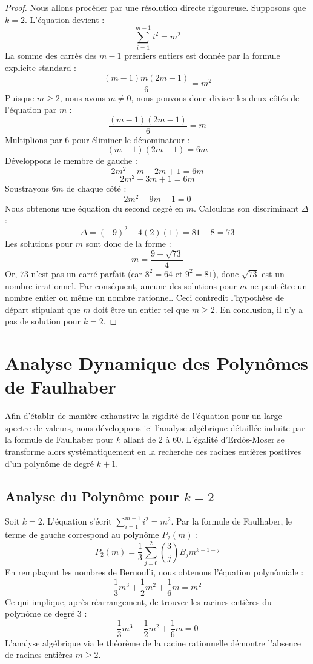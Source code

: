 \documentclass[11pt,a4paper]{article}
\begin{document}
\begin{proof}
Nous allons procéder par une résolution directe rigoureuse.
Supposons que $k=2$. L'équation devient :
$$ \sum_{i=1}^{m-1} i^2 = m^2 $$
La somme des carrés des $m-1$ premiers entiers est donnée par la formule explicite standard :
$$ \frac{(m-1)m(2m-1)}{6} = m^2 $$
Puisque $m \geq 2$, nous avons $m \neq 0$, nous pouvons donc diviser les deux côtés de l'équation par $m$ :
$$ \frac{(m-1)(2m-1)}{6} = m $$
Multiplions par $6$ pour éliminer le dénominateur :
$$ (m-1)(2m-1) = 6m $$
Développons le membre de gauche :
$$ 2m^2 - m - 2m + 1 = 6m $$
$$ 2m^2 - 3m + 1 = 6m $$
Soustrayons $6m$ de chaque côté :
$$ 2m^2 - 9m + 1 = 0 $$
Nous obtenons une équation du second degré en $m$. Calculons son discriminant $\Delta$ :
$$ \Delta = (-9)^2 - 4(2)(1) = 81 - 8 = 73 $$
Les solutions pour $m$ sont donc de la forme :
$$ m = \frac{9 \pm \sqrt{73}}{4} $$
Or, $73$ n'est pas un carré parfait (car $8^2 = 64$ et $9^2 = 81$), donc $\sqrt{73}$ est un nombre irrationnel.
Par conséquent, aucune des solutions pour $m$ ne peut être un nombre entier ou même un nombre rationnel.
Ceci contredit l'hypothèse de départ stipulant que $m$ doit être un entier tel que $m \geq 2$.
En conclusion, il n'y a pas de solution pour $k=2$.
\end{proof}

\section{Analyse Dynamique des Polynômes de Faulhaber}

Afin d'établir de manière exhaustive la rigidité de l'équation pour un large spectre de valeurs, nous développons ici l'analyse algébrique détaillée induite par la formule de Faulhaber pour $k$ allant de 2 à 60. L'égalité d'Erd\H{o}s-Moser se transforme alors systématiquement en la recherche des racines entières positives d'un polynôme de degré $k+1$.

\subsection{Analyse du Polynôme pour $k = 2$}
Soit $k = 2$. L'équation s'écrit $\sum_{i=1}^{m-1} i^{2} = m^{2}$.
Par la formule de Faulhaber, le terme de gauche correspond au polynôme $P_{2}(m)$ :
$$ P_{2}(m) = \frac{1}{3} \sum_{j=0}^{2} \binom{3}{j} B_j m^{k+1-j} $$
En remplaçant les nombres de Bernoulli, nous obtenons l'équation polynômiale :
$$ \frac{1}{3} m^3+\frac{1}{2} m^2+\frac{1}{6} m = m^{2} $$
Ce qui implique, après réarrangement, de trouver les racines entières du polynôme de degré $3$ :
$$ \frac{1}{3} m^3-\frac{1}{2} m^2+\frac{1}{6} m = 0 $$
L'analyse algébrique via le théorème de la racine rationnelle démontre l'absence de racines entières $m \geq 2$.
\end{document}
